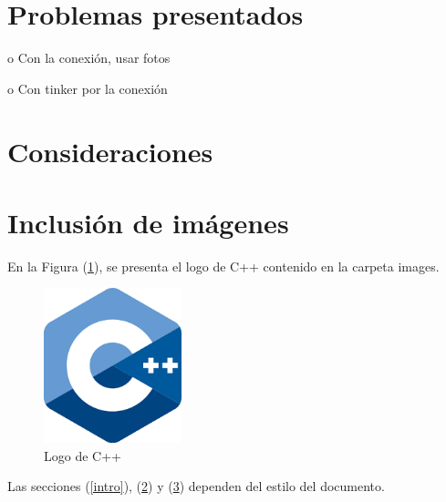 \documentclass{article}
\begin{document}
\section{Problemas presentados} \label{contenido}
o	Con la conexión, usar fotos\par
o	Con tinker por la conexión\par


\section{Consideraciones} \label{contenido}



\section{Inclusión de imágenes} \label{imagenes}

En la Figura (\ref{fig:cpplogo}), se presenta el logo de C++ contenido en la carpeta images.

\begin{figure}[h]
\includegraphics[width=4cm]{cpplogo.png}
\centering
\caption{Logo de C++}
\label{fig:cpplogo}
\end{figure}

Las secciones (\ref{intro}), (\ref{contenido}) y (\ref{imagenes}) dependen del estilo del documento.



\end{document}
